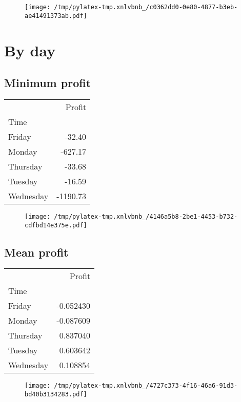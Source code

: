 \documentclass{article}%
\begin{document}
\begin{figure}[htbp]%
\centering%
\texttt{[image: /tmp/pylatex-tmp.xnlvbnb\_/c0362dd0-0e80-4877-b3eb-ae41491373ab.pdf]}%
\end{figure}

%
\newpage %
\section{By day}%
\label{sec:Byday}%
\subsection{Minimum profit }%
\label{subsec:Minimumprofit}%
\begin{tabular}{lr}
\toprule
{} &   Profit \\
Time      &          \\
\midrule
Friday    &   -32.40 \\
Monday    &  -627.17 \\
Thursday  &   -33.68 \\
Tuesday   &   -16.59 \\
Wednesday & -1190.73 \\
\bottomrule
\end{tabular}
%


\begin{figure}[htbp]%
\centering%
\texttt{[image: /tmp/pylatex-tmp.xnlvbnb\_/4146a5b8-2be1-4453-b732-cdfbd14e375e.pdf]}%
\end{figure}

%
\newpage %
\subsection{Mean profit }%
\label{subsec:Meanprofit}%
\begin{tabular}{lr}
\toprule
{} &    Profit \\
Time      &           \\
\midrule
Friday    & -0.052430 \\
Monday    & -0.087609 \\
Thursday  &  0.837040 \\
Tuesday   &  0.603642 \\
Wednesday &  0.108854 \\
\bottomrule
\end{tabular}
%


\begin{figure}[htbp]%
\centering%
\texttt{[image: /tmp/pylatex-tmp.xnlvbnb\_/4727c373-4f16-46a6-91d3-bd40b3134283.pdf]}%
\end{figure}
\end{document}
